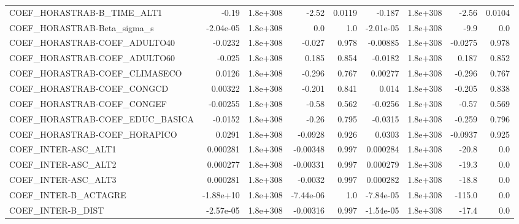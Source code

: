 \begin{tabular}{lrrrrrrrr}
COEF\_HORASTRAB-B\_TIME\_ALT1        &       -0.19 &     1.8e+308 &     -2.52 &   0.0119 &     -0.187 &    1.8e+308 &        -2.56 &        0.0104 \\
COEF\_HORASTRAB-Beta\_sigma\_s       &   -2.04e-05 &     1.8e+308 &       0.0 &      1.0 &  -2.01e-05 &    1.8e+308 &         -9.9 &           0.0 \\
COEF\_HORASTRAB-COEF\_ADULTO40      &     -0.0232 &     1.8e+308 &    -0.027 &    0.978 &   -0.00885 &    1.8e+308 &      -0.0275 &         0.978 \\
COEF\_HORASTRAB-COEF\_ADULTO60      &      -0.025 &     1.8e+308 &     0.185 &    0.854 &    -0.0182 &    1.8e+308 &        0.187 &         0.852 \\
COEF\_HORASTRAB-COEF\_CLIMASECO     &      0.0126 &     1.8e+308 &    -0.296 &    0.767 &    0.00277 &    1.8e+308 &       -0.296 &         0.767 \\
COEF\_HORASTRAB-COEF\_CONGCD        &     0.00322 &     1.8e+308 &    -0.201 &    0.841 &      0.014 &    1.8e+308 &       -0.205 &         0.838 \\
COEF\_HORASTRAB-COEF\_CONGEF        &    -0.00255 &     1.8e+308 &     -0.58 &    0.562 &    -0.0256 &    1.8e+308 &        -0.57 &         0.569 \\
COEF\_HORASTRAB-COEF\_EDUC\_BASICA   &     -0.0152 &     1.8e+308 &     -0.26 &    0.795 &    -0.0315 &    1.8e+308 &       -0.259 &         0.796 \\
COEF\_HORASTRAB-COEF\_HORAPICO      &      0.0291 &     1.8e+308 &   -0.0928 &    0.926 &     0.0303 &    1.8e+308 &      -0.0937 &         0.925 \\
COEF\_INTER-ASC\_ALT1               &    0.000281 &     1.8e+308 &  -0.00348 &    0.997 &   0.000284 &    1.8e+308 &        -20.8 &           0.0 \\
COEF\_INTER-ASC\_ALT2               &    0.000277 &     1.8e+308 &  -0.00331 &    0.997 &   0.000279 &    1.8e+308 &        -19.3 &           0.0 \\
COEF\_INTER-ASC\_ALT3               &    0.000281 &     1.8e+308 &   -0.0032 &    0.997 &   0.000282 &    1.8e+308 &        -18.8 &           0.0 \\
COEF\_INTER-B\_ACTAGRE              &   -1.88e+10 &     1.8e+308 & -7.44e-06 &      1.0 &  -7.84e-05 &    1.8e+308 &       -115.0 &           0.0 \\
COEF\_INTER-B\_DIST                 &   -2.57e-05 &     1.8e+308 &  -0.00316 &    0.997 &  -1.54e-05 &    1.8e+308 &        -17.4 &           0.0 \\

\end{tabular}
